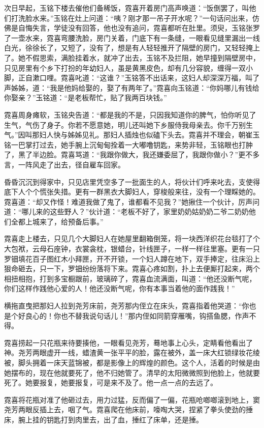 \par 次日早起，玉铭下楼去催他们备稀饭，霓喜开着房门高声唤道：“饭倒罢了，叫他们打洗脸水来。”玉铭在灶上问道：“咦？刚才那一吊子开水呢？”一句话问出来，仿佛是自悔失言，学徒没有回答，他也没有追问，霓喜都听在肚里。须臾，玉铭张罗了一壶水来，霓喜弯腰洗脸，房门关着，门底下有一条缝，一眼看见缝里漏出一线白光，徐徐长了，又短了，没有了，想是有人轻轻推开了隔壁的房门，又轻轻掩上了。她不假思索，满脸挂着水，就冲了出去，玉铭不及拦阻，她早撞到隔壁房中，只见房里有个乡下打扮的年幼妇人，虽是黄黑皮色，却有几分容貌，缠得一双小脚，正自漱口哩。霓喜叱道：“这谁？”玉铭答不出话来，这妇人却深深万福，叫了声姊姊，道：“我是他妈给娶的，娶了有两年了。”霓喜向玉铭道：“你妈哪儿有钱给你娶亲？”玉铭道：“是老板帮忙，贴了我两百块钱。”
\par 霓喜周身瘫软，玉铭央告道：“都是我的不是，只因我知道你的脾气，怕你听见了生气，气伤了身子。你若不愿意她，明儿还叫她下乡服侍我母亲去。你千万别生气。”因叫那妇人快与姊姊见礼。那妇人插烛也似磕下头去。霓喜并不理会，朝崔玉铭一巴掌打过去，她手腕上沉甸甸拴着一大嘟噜钥匙，来势非轻，玉铭眼也打肿了，黑了半边脸。霓喜骂道：“我跟你做大，我还嫌委屈了，我跟你做小？”更不多言，一阵风走了出去，径自雇车回家。
\par 昏昏沉沉到得家中，只见店里凭空多了一批面生的人，将伙计们呼来叱去，支使得底下人个个慌张失措。更有一群黑衣大脚妇人，穿梭般来往，没有一个理睬她的。霓喜道：“却又作怪！难道我做了鬼了，谁都看不见我？”她揪住一个伙计，厉声问道：“哪儿来的这些野人？”伙计道：“老板不好了，家里奶奶姑奶奶二爷二奶奶他们全都上城来了，给预备后事。”
\par 霓喜走上楼去，只见几个大脚妇人在她屋里翻箱倒笼，将一块西洋织花台毯打了个大包袱，云母石座钟，衣裳衾枕，银蜡台，针线匣子，一样一样往里塞。更有一只罗钿填花百子图红木小拜匣，开不开锁，一个妇人蹲在地下，双手捧定，往床沿上狠命砸去，只一下，罗钿纷纷落将下来。霓喜心疼如割，扑上去便厮打起来，两个相扭相抱，打到多宝橱跟前，玻璃碎了，霓喜血流满面，叫道：“他还没断气呢，你们这样作践他心爱的人！他还没断气呢，你有本事当着他的面作践我！”
\par 横拖直曳把那妇人拉到尧芳床前，尧芳那内侄立在床头，霓喜指着他哭道：“你也是个好良心的！你也不替我说句话儿！”那内侄如同箭穿雁嘴，钩搭鱼腮，作声不得。
\par 霓喜捞起一只花瓶来待要揍他，一眼看见尧芳，蓦地事上心头，定睛看他看出了神。尧芳两眼虚开一线，蜡渣黄一张平平的脸，露在被外，盖一床大红锁绿妆花绫被，脚头拥着一床天蓝锦被，都是影像上的辉煌的颜色。这个人，活着的时候是由她摆布的，现在他就要死了，他不归她管了。清早的太阳微微照到他脸上，他就要死了。她要报复，她要报复，可是来不及了。他一点一点的去远了。
\par 霓喜将花瓶对准了他砸过去，用力过猛，反而偏了一偏，花瓶呛啷啷滚到地上，窦尧芳两眼反插上去，咽了气。霓喜爬在他床前，嚎啕大哭，捏紧了拳头使劲的捶床，腕上挂的钥匙打到肉里去，出了血，捶红了床单，还是捶。
